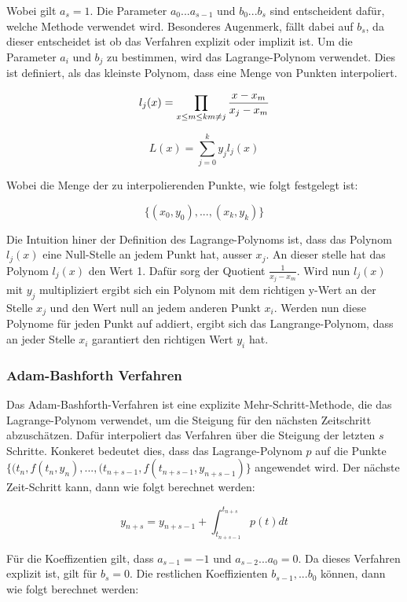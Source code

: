 Wobei gilt $a_s = 1$.  Die Parameter $a_0 ... a_{s-1}$ und $b_0 ... b_{s}$ sind entscheident dafür, welche Methode verwendet wird.
Besonderes Augenmerk, fällt dabei auf $b_s$, da dieser entscheidet ist ob das Verfahren explizit oder implizit ist.
Um die Parameter $a_i$ und $b_j$ zu bestimmen, wird das Lagrange-Polynom verwendet.
Dies ist definiert, als das kleinste Polynom, dass eine Menge von Punkten interpoliert.

$$
l_j(x) = \prod_{x \leq m \leq k \\ m \neq j} \frac{x - x_m}{x_j - x_m}
$$

$$
L(x) = \sum_{j = 0}^{k} y_j l_j(x)
$$

Wobei die Menge der zu interpolierenden Punkte, wie folgt festgelegt ist:

$$
\{(x_0, y_0), ..., (x_k, y_k)\}
$$

Die Intuition hiner der Definition des Lagrange-Polynoms ist, 
dass das Polynom $l_j(x)$ eine Null-Stelle an jedem Punkt hat, ausser $x_j$. 
An dieser stelle hat das Polynom $l_j(x)$ den Wert 1.
Dafür sorg der Quotient $\frac{1}{x_j - x_m}$.
Wird nun $l_j(x)$ mit $y_j$ multipliziert ergibt sich ein Polynom mit dem richtigen y-Wert an der Stelle $x_j$ und den Wert null an jedem anderen Punkt $x_i$.
Werden nun diese Polynome für jeden Punkt auf addiert,
ergibt sich das Langrange-Polynom, dass an jeder Stelle $x_i$ garantiert den richtigen Wert $y_i$ hat.


\subsubsection{Adam-Bashforth Verfahren} \label{sec:adam-bashforth}

Das Adam-Bashforth-Verfahren ist eine explizite Mehr-Schritt-Methode, 
die das Lagrange-Polynom verwendet, 
um die Steigung für den nächsten Zeitschritt abzuschätzen. 
Dafür interpoliert das Verfahren über die Steigung der letzten $s$ Schritte.
Konkeret bedeutet dies, dass das Lagrange-Polynom $p$ auf die Punkte $\{(t_{n}, f(t_{n}, y_{n}), ..., (t_{n + s - 1}, f(t_{n + s - 1}, y_{n + s - 1})\}$ angewendet wird.
Der nächste Zeit-Schritt kann, dann wie folgt berechnet werden:

$$
y_{n + s} = y_{n + s -1} + \int_{t_{n+s-1}}^{t_{n + s}} p(t) dt
$$

Für die Koeffizentien gilt, dass $a_{s-1} = -1$ und $a_{s-2} ... a_{0} = 0$. 
Da dieses Verfahren explizit ist, gilt für $b_s = 0$. Die restlichen Koeffizienten $b_{s-1}, ... b_{0}$
können, dann wie folgt berechnet werden:

